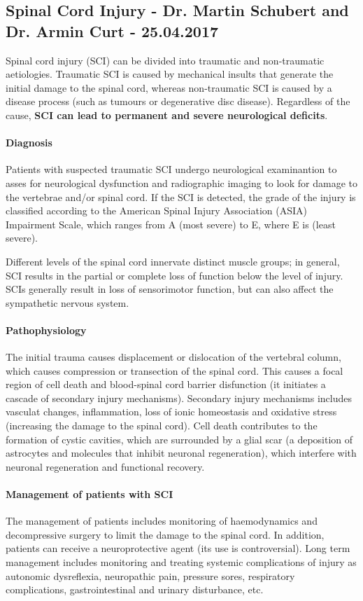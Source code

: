 \documentclass[12pt,article,oneside,a4paper]{memoir}
\begin{document}
\subsection{Spinal Cord Injury - Dr. Martin Schubert and Dr. Armin Curt - 25.04.2017}

Spinal cord injury (SCI) can be divided into traumatic and non-traumatic aetiologies. Traumatic SCI is caused by mechanical insults that generate the initial damage to the spinal cord, whereas non-traumatic SCI is caused by a disease process (such as tumours or degenerative disc disease). Regardless of the cause, \textbf{SCI can lead to permanent and severe neurological deficits}.

\paragraph{Diagnosis}
Patients with suspected traumatic SCI undergo neurological examinantion to asses for neurological dysfunction and radiographic imaging to look for damage to the vertebrae and/or spinal cord.
If the SCI is detected, the grade of the injury is classified according to the American Spinal Injury Association (ASIA) Impairment Scale, which ranges from A (most severe) to E, where E is (least severe).

Different levels of the spinal cord innervate distinct muscle groups; in general, SCI results in the partial or complete loss of function below the level of injury. SCIs generally result in loss of sensorimotor function, but can also affect the sympathetic nervous system.

\paragraph{Pathophysiology}
The initial trauma causes displacement or dislocation of the vertebral column, which causes compression or transection of the spinal cord. This causes a focal region of cell death and blood-spinal cord barrier disfunction (it initiates a cascade of secondary injury mechanisms). Secondary injury mechanisms includes vasculat changes, inflammation, loss of ionic homeostasis and oxidative stress (increasing the damage to the spinal cord). Cell death contributes to the formation of cystic cavities, which are surrounded by a glial scar (a deposition of astrocytes and molecules that inhibit neuronal regeneration), which interfere with neuronal regeneration and functional recovery.

\paragraph{Management of patients with SCI}
The management of patients includes monitoring of haemodynamics and decompressive surgery to limit the damage to the spinal cord. In addition, patients can receive a neuroprotective agent (its use is controversial). Long term management includes monitoring and treating systemic complications of injury as autonomic dysreflexia, neuropathic pain, pressure sores, respiratory complications, gastrointestinal and urinary disturbance, etc.
\end{document}
